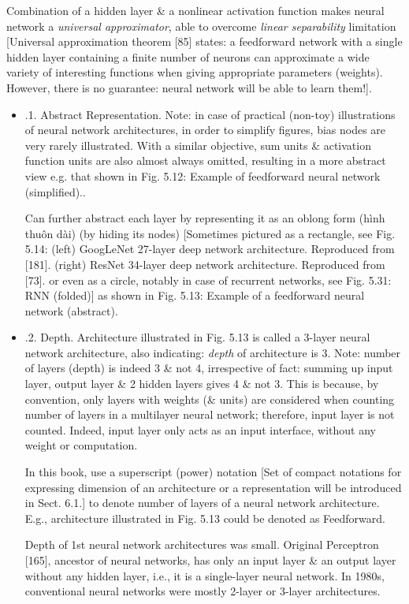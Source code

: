 \documentclass{article}
\begin{document}
\begin{itemize}
\begin{itemize}
		Combination of a hidden layer \& a nonlinear activation function makes neural network a {\it universal approximator}, able to overcome {\it linear separability} limitation [Universal approximation theorem [85] states: a feedforward network with a single hidden layer containing a finite number of neurons can approximate a wide variety of interesting functions when giving appropriate parameters (weights). However, there is no guarantee: neural network will be able to learn them!].
		\begin{itemize}
			\item {.1. Abstract Representation.} Note: in case of practical (non-toy) illustrations of neural network architectures, in order to simplify figures, bias nodes are very rarely illustrated. With a similar objective, sum units \& activation function units are also almost always omitted, resulting in a more abstract view e.g. that shown in {\sf Fig. 5.12: Example of feedforward neural network (simplified).}.
			
			Can further abstract each layer by representing it as an oblong form (hình thuôn dài) (by hiding its nodes) [Sometimes pictured as a rectangle, see {\sf Fig. 5.14: (left) GoogLeNet 27-layer deep network architecture. Reproduced from [181]. (right) ResNet 34-layer deep network architecture. Reproduced from [73].} or even as a circle, notably in case of recurrent networks, see {\sf Fig. 5.31: RNN (folded)}] as shown in {\sf Fig. 5.13: Example of a feedforward neural network (abstract)}.
			\item {.2. Depth.} Architecture illustrated in {\sf Fig. 5.13} is called a 3-layer neural network architecture, also indicating: {\it depth} of architecture is 3. Note: number of layers (depth) is indeed 3 \& not 4, irrespective of fact: summing up input layer, output layer \& 2 hidden layers gives 4 \& not 3. This is because, by convention, only layers with weights (\& units) are considered when counting number of layers in a multilayer neural network; therefore, input layer is not counted. Indeed, input layer only acts as an input interface, without any weight or computation.
			
			In this book, use a superscript (power) notation [Set of compact notations for expressing dimension of an architecture or a representation will be introduced in Sect. 6.1.] to denote number of layers of a neural network architecture. E.g., architecture illustrated in {\sf Fig. 5.13} could be denoted as Feedforward.
			
			Depth of 1st neural network architectures was small. Original Perceptron [165], ancestor of neural networks, has only an input layer \& an output layer without any hidden layer, i.e., it is a single-layer neural network. In 1980s, conventional neural networks were mostly 2-layer or 3-layer architectures.
			

\end{itemize}
\end{itemize}
\end{itemize}
\end{document}
